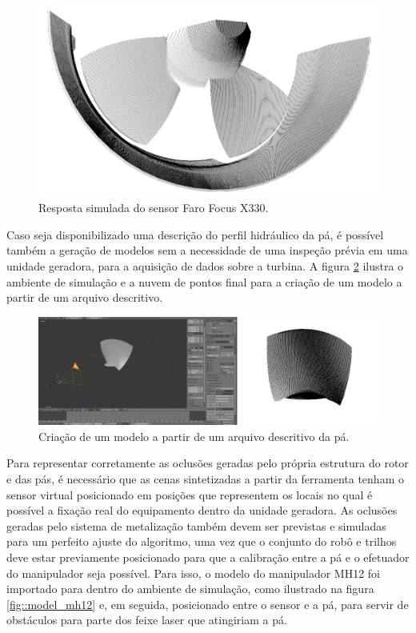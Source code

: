  \begin{figure}[H]
	\centering
	\includegraphics[width=0.9\columnwidth]{figs/calibracao/blensor_faro}
	\caption{Resposta simulada do sensor Faro Focus X330.}
    \label{fig::blensor_faro}
\end{figure}	


Caso seja disponibilizado uma descrição do perfil hidráulico da pá, é possível
também a geração de modelos sem a necessidade de uma inspeção prévia em uma
unidade geradora, para a aquisição de
dados sobre a turbina. A figura \ref{fig::modelo_pa} ilustra o ambiente de simulação e a
nuvem de pontos final para a criação de um modelo a partir de um arquivo
descritivo. 


\begin{figure}[h!]
	\centering
	\includegraphics[width=0.9\columnwidth]{figs/calibracao/blensor_pa_sim}
	\caption{Criação de um modelo a partir de um arquivo descritivo da pá.}
    \label{fig::modelo_pa}
\end{figure}

Para representar corretamente as oclusões geradas pelo própria estrutura do
rotor e das pás, é necessário que as cenas sintetizadas a partir da ferramenta
tenham o sensor virtual posicionado em posições que representem os locais no
qual é possível a fixação real do equipamento dentro da unidade geradora. As
oclusões geradas pelo sistema de metalização também devem ser previstas e simuladas para um
perfeito ajuste do algoritmo, uma vez que o conjunto do robô e trilhos deve
estar previamente posicionado para que a calibração entre a pá e o efetuador do
manipulador seja possível. Para isso, o modelo do manipulador MH12 foi
importado para dentro do ambiente de simulação, como ilustrado na figura
\ref{fig::model_mh12} e, em seguida, posicionado entre o sensor e a pá, para
servir de obstáculos para parte dos feixe laser que atingiriam a pá.



